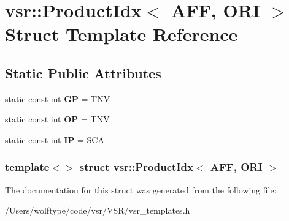 \hypertarget{structvsr_1_1_product_idx_3_01_a_f_f_00_01_o_r_i_01_4}{\section{vsr\-:\-:Product\-Idx$<$ A\-F\-F, O\-R\-I $>$ Struct Template Reference}
\label{structvsr_1_1_product_idx_3_01_a_f_f_00_01_o_r_i_01_4}
}
\subsection*{Static Public Attributes}
\begin{DoxyCompactItemize}
\item 
\hypertarget{structvsr_1_1_product_idx_3_01_a_f_f_00_01_o_r_i_01_4_ac9bba91fb45651e3af38345121f09b06}{static const int {\bfseries G\-P} = T\-N\-V}\label{structvsr_1_1_product_idx_3_01_a_f_f_00_01_o_r_i_01_4_ac9bba91fb45651e3af38345121f09b06}

\item 
\hypertarget{structvsr_1_1_product_idx_3_01_a_f_f_00_01_o_r_i_01_4_aba614865db358a37d9fb486aebce65ba}{static const int {\bfseries O\-P} = T\-N\-V}\label{structvsr_1_1_product_idx_3_01_a_f_f_00_01_o_r_i_01_4_aba614865db358a37d9fb486aebce65ba}

\item 
\hypertarget{structvsr_1_1_product_idx_3_01_a_f_f_00_01_o_r_i_01_4_a814f014208890036c1da388036a52f03}{static const int {\bfseries I\-P} = S\-C\-A}\label{structvsr_1_1_product_idx_3_01_a_f_f_00_01_o_r_i_01_4_a814f014208890036c1da388036a52f03}

\end{DoxyCompactItemize}
\subsubsection*{template$<$$>$ struct vsr\-::\-Product\-Idx$<$ A\-F\-F, O\-R\-I $>$}



The documentation for this struct was generated from the following file\-:\begin{DoxyCompactItemize}
\item 
/\-Users/wolftype/code/vsr/\-V\-S\-R/vsr\-\_\-templates.\-h\end{DoxyCompactItemize}
